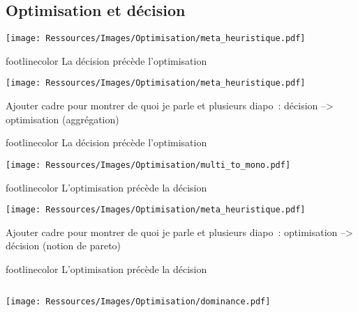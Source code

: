 \documentclass[xcolor=x11names, compress, 11pt]{beamer}
\newcommand{\addsubtitle}[1]{%
\begin{beamercolorbox}[sep=2pt,center,shadow=true,rounded=true]{footlinecolor}
    #1\par%
\end{beamercolorbox}%
}
\begin{document}
\subsection{Optimisation et décision}
\begin{frame}[c]
    \vfill
    \centering
    \texttt{[image: Ressources/Images/Optimisation/meta\_heuristique.pdf]}
    \vfill
\end{frame}

\begin{frame}[t]
    \addsubtitle{La décision précède l’optimisation}
    \vfill
    \centering
    \texttt{[image: Ressources/Images/Optimisation/meta\_heuristique.pdf]}
    \vfill

Ajouter cadre pour montrer de quoi je parle et plusieurs diapo~: décision --> optimisation (aggrégation)
\end{frame}

\begin{frame}[t]
    \addsubtitle{La décision précède l’optimisation}
    \vfill
    \centering
    \texttt{[image: Ressources/Images/Optimisation/multi\_to\_mono.pdf]}
    \vfill
\end{frame}

\begin{frame}[t]
    \addsubtitle{L’optimisation précède la décision}
    \vfill
    \centering
    \texttt{[image: Ressources/Images/Optimisation/meta\_heuristique.pdf]}
    \vfill

Ajouter cadre pour montrer de quoi je parle et plusieurs diapo~: optimisation --> décision (notion de pareto)
\end{frame}

\begin{frame}[t]
    \addsubtitle{L’optimisation précède la décision}
    \vfill
    \begin{columns}
        \begin{column}{0.7\textwidth}
            \centering
            \texttt{[image: Ressources/Images/Optimisation/dominance.pdf]}
        \end{column}%
    \end{columns}%

    \vfill
\end{frame}
\end{document}
